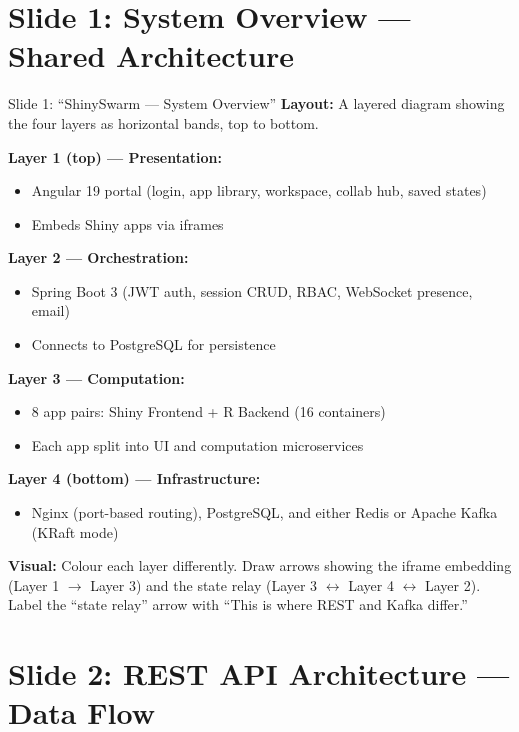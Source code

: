 \documentclass[12pt,a4paper]{article}
\begin{document}
\section{Slide 1: System Overview --- Shared Architecture}

\begin{slidebox}{Slide 1: ``ShinySwarm --- System Overview''}
\textbf{Layout:} A layered diagram showing the four layers as horizontal bands, top to bottom.

\textbf{Layer 1 (top) --- Presentation:}
\begin{itemize}[nosep]
  \item Angular 19 portal (login, app library, workspace, collab hub, saved states)
  \item Embeds Shiny apps via iframes
\end{itemize}

\textbf{Layer 2 --- Orchestration:}
\begin{itemize}[nosep]
  \item Spring Boot 3 (JWT auth, session CRUD, RBAC, WebSocket presence, email)
  \item Connects to PostgreSQL for persistence
\end{itemize}

\textbf{Layer 3 --- Computation:}
\begin{itemize}[nosep]
  \item 8 app pairs: Shiny Frontend + R Backend (16 containers)
  \item Each app split into UI and computation microservices
\end{itemize}

\textbf{Layer 4 (bottom) --- Infrastructure:}
\begin{itemize}[nosep]
  \item Nginx (port-based routing), PostgreSQL, and either Redis or Apache Kafka (KRaft mode)
\end{itemize}

\textbf{Visual:} Colour each layer differently. Draw arrows showing the iframe embedding (Layer 1 $\rightarrow$ Layer 3) and the state relay (Layer 3 $\leftrightarrow$ Layer 4 $\leftrightarrow$ Layer 2). Label the ``state relay'' arrow with ``This is where REST and Kafka differ.''
\end{slidebox}

\section{Slide 2: REST API Architecture --- Data Flow}
\end{document}
